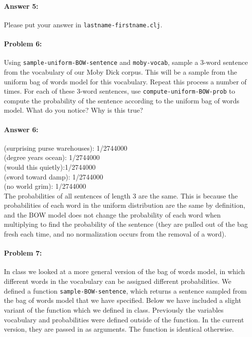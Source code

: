 \documentclass[10pt]{article}
\begin{document}
\paragraph{Answer 5:} Please put your answer in
\texttt{lastname-firstname.clj}.

\hrulefill
\paragraph{Problem 6:}

Using \texttt{sample-uniform-BOW-sentence} and \texttt{moby-vocab},
sample a 3-word sentence from the vocabulary of our Moby Dick
corpus. This will be a sample from the uniform bag of words model for
this vocabulary. Repeat this process a number of times. For each of
these 3-word sentences, use \texttt{compute-uniform-BOW-prob} to
compute the probability of the sentence according to the uniform bag
of words model. What do you notice? Why is this true?

\paragraph{Answer 6:} 
(surprising purse warehouses): 1/2744000 \\
(degree years ocean): 1/2744000 \\
(would this quietly):1/2744000 \\
(sword toward damp): 1/2744000 \\
(no world grim): 1/2744000 \\

The probabilities of all sentences of length 3 are the same. This is because the probabilities of each word in the uniform distribution are the same by definition, and the BOW model does not change the probability of each word when multiplying to find the probability of the sentence (they are pulled out of the bag fresh each time, and no normalization occurs from the removal of a word). 

\hrulefill
\paragraph{Problem 7:}

In class we looked at a more general version of the bag of words
model, in which different words in the vocabulary can be assigned
different probabilities. We defined a function \texttt{sample-BOW-sentence},
which returns a sentence sampled from the bag of words model that we
have specified. Below we have included a slight variant of the
function which we defined in class. Previously the variables
vocabulary and probabilities were defined outside of the function. In
the current version, they are passed in as arguments. The function is
identical otherwise.
\end{document}
